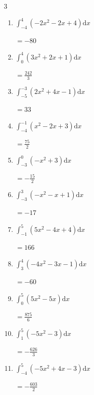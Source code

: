 \begin{multicols}{3}
\begin{enumerate}
  \item $\displaystyle \int_{-4}^{4}\left( -2x^{2}-2x+4 \right) \mathrm{d}x$

        $\displaystyle =-80$

\columnbreak %

  \item $\displaystyle \int_{0}^{4}\left( 3x^{2}+2x+1 \right) \mathrm{d}x$

        $\displaystyle =\frac{242}{3}$

  \item $\displaystyle \int_{-5}^{-3}\left( 2x^{2}+4x-1 \right) \mathrm{d}x$

        $\displaystyle =33$

  \item $\displaystyle \int_{-4}^{-1}\left( x^{2}-2x+3 \right) \mathrm{d}x$

        $\displaystyle =\frac{75}{2}$

  \item $\displaystyle \int_{-3}^{0}\left( -x^{2}+3 \right) \mathrm{d}x$

        $\displaystyle =-\frac{15}{2}$

  \item $\displaystyle \int_{-3}^{3}\left( -x^{2}-x+1 \right) \mathrm{d}x$

        $\displaystyle =-17$

\columnbreak %

  \item $\displaystyle \int_{-1}^{5}\left( 5x^{2}-4x+4 \right) \mathrm{d}x$

        $\displaystyle =166$

  \item $\displaystyle \int_{3}^{4}\left( -4x^{2}-3x-1 \right) \mathrm{d}x$

        $\displaystyle =-60$

  \item $\displaystyle \int_{0}^{5}\left( 5x^{2}-5x \right) \mathrm{d}x$

        $\displaystyle =\frac{875}{6}$

  \item $\displaystyle \int_{1}^{5}\left( -5x^{2}-3 \right) \mathrm{d}x$

        $\displaystyle =-\frac{626}{3}$

  \item $\displaystyle \int_{-4}^{5}\left( -5x^{2}+4x-3 \right) \mathrm{d}x$

        $\displaystyle =-\frac{603}{2}$


\end{enumerate}
\end{multicols}
